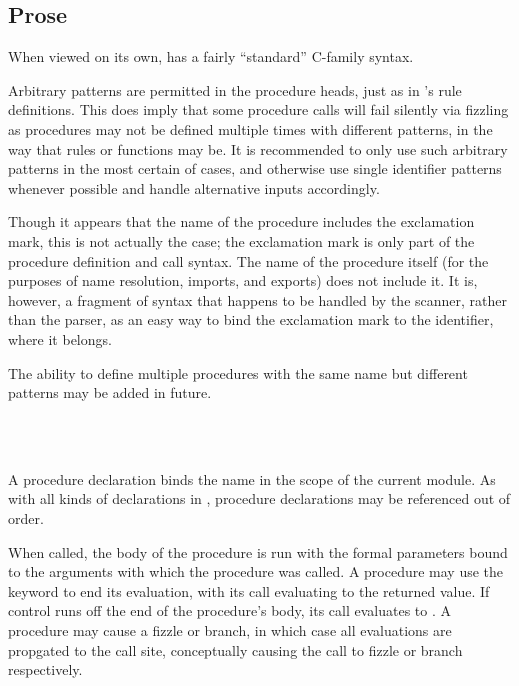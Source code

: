 \subsection{Prose}

When viewed on its own, \Prose{} has a fairly ``standard'' C-family syntax.

Arbitrary patterns are permitted in the procedure heads, just as in \Law{}'s
rule definitions. This does imply that some procedure calls will fail silently
via fizzling as procedures may not be defined multiple times with different
patterns, in the way that rules or functions may be. It is recommended to only
use such arbitrary patterns in the most certain of cases, and otherwise use
single identifier patterns whenever possible and handle alternative inputs
accordingly.

Though it appears that the name of the procedure includes the exclamation mark,
this is not actually the case; the exclamation mark is only part of the procedure
definition and call syntax. The name of the procedure itself (for the purposes
of name resolution, imports, and exports) does not include it. It is, however,
a fragment of syntax that happens to be handled by the scanner, rather than the
parser, as an easy way to bind the exclamation mark to the identifier, where
it belongs.

The ability to define multiple procedures with the same name but different
patterns may be added in future.

\begin{bnf*}
     \\
     \\
\end{bnf*}

\noindent A procedure declaration binds the name in the scope of the current module.
As with all kinds of declarations in \Trilogy{}, procedure declarations may be
referenced out of order.

When called, the body of the procedure is run with the formal parameters bound to
the arguments with which the procedure was called. A procedure may use the 
keyword to end its evaluation, with its call evaluating to the returned value.
If control runs off the end of the procedure's body, its call evaluates to .
A procedure may cause a fizzle or branch, in which case all evaluations are propgated
to the call site, conceptually causing the call to fizzle or branch respectively.

